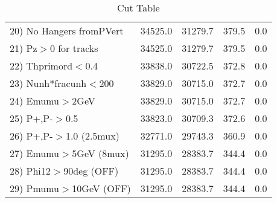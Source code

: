 \begin{table}[h!]
\begin{tabular}{||l||r|r|r|r||}
 20) No Hangers fromPVert &     34525.0 &     31279.7 &       379.5 &         0.0 \\
 21) Pz$>$0 for tracks    &     34525.0 &     31279.7 &       379.5 &         0.0 \\
 22) Thprimord$<$0.4      &     33838.0 &     30722.5 &       372.8 &         0.0 \\
 23) Nunh*fracunh$<$200   &     33829.0 &     30715.0 &       372.7 &         0.0 \\
 24) Emumu$>$2GeV         &     33829.0 &     30715.0 &       372.7 &         0.0 \\
 25) P+,P-$>$0.5          &     33823.0 &     30709.3 &       372.6 &         0.0 \\
 26) P+,P-$>$1.0 (2.5mux) &     32771.0 &     29743.3 &       360.9 &         0.0 \\
 27) Emumu$>$5GeV  (8mux) &     31295.0 &     28383.7 &       344.4 &         0.0 \\
 28) Phi12$>$90deg  (OFF) &     31295.0 &     28383.7 &       344.4 &         0.0 \\
 29) Pmumu$>$10GeV  (OFF) &     31295.0 &     28383.7 &       344.4 &         0.0 \\
 \hline
 \hline
 \end{tabular}
 \caption{Cut Table \cohpip }
 \label{tab-cut_copip}
 \end{table}
